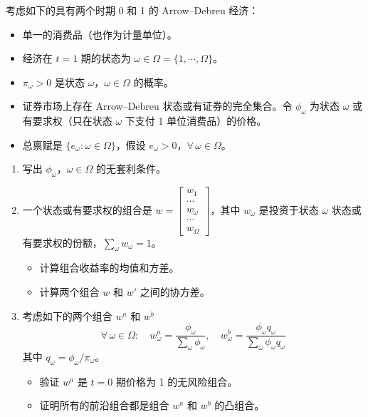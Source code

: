 \begin{problem}
 考虑如下的具有两个时期 0 和 1 的 Arrow--Debreu 经济：
\begin{itemize}
    \item 单一的消费品（也作为计量单位）。
    \item 经济在 $t=1$ 期的状态为 $\omega\in\Omega=\{1,\cdots,\Omega\}$。
    \item $\pi_{\omega}>0$ 是状态 $\omega$，$\omega\in\Omega$ 的概率。
    \item 证券市场上存在 Arrow--Debreu 状态或有证券的完全集合。令 $\phi_{\omega}$ 为状态 $\omega$ 或有要求权（只在状态 $\omega$ 下支付 1 单位消费品）的价格。
    \item 总禀赋是 $\{e_{\omega}:\omega\in\Omega\}$，假设 $e_{\omega}>0$，$\forall\,\omega\in\Omega$。
\end{itemize}
\begin{enumerate}[label=(\alph*)]
    \item 写出 $\phi_{\omega}$，$\omega\in\Omega$ 的无套利条件。
    \item 一个状态或有要求权的组合是 $w=\begin{bmatrix}w_{1} \\ \cdots \\ w_{\omega} \\ \cdots \\ w_{\Omega}\end{bmatrix}$，其中 $w_{\omega}$ 是投资于状态 $\omega$ 状态或有要求权的份额，$\sum_{\omega}w_{\omega}=1$。
    \begin{itemize}
        \item 计算组合收益率的均值和方差。
        \item 计算两个组合 $w$ 和 $w'$ 之间的协方差。
    \end{itemize}
    \item 考虑如下的两个组合 $w^{a}$ 和 $w^{b}$
    \[
        \forall\,\omega\in\Omega:\quad w_{\omega}^{a}=\frac{\phi_{\omega}}{\sum_{\omega}\phi_{\omega}},\quad w_{\omega}^{b}=\frac{\phi_{\omega}q_{\omega}}{\sum_{\omega}\phi_{\omega}q_{\omega}}
    \]
    其中 $q_{\omega}=\phi_{\omega}/\pi_{\omega}$。
    \begin{itemize}
        \item 验证 $w^{a}$ 是 $t=0$ 期价格为 1 的无风险组合。
        \item 证明所有的前沿组合都是组合 $w^{a}$ 和 $w^{b}$ 的凸组合。
    \end{itemize}
\end{enumerate}
\end{problem}
